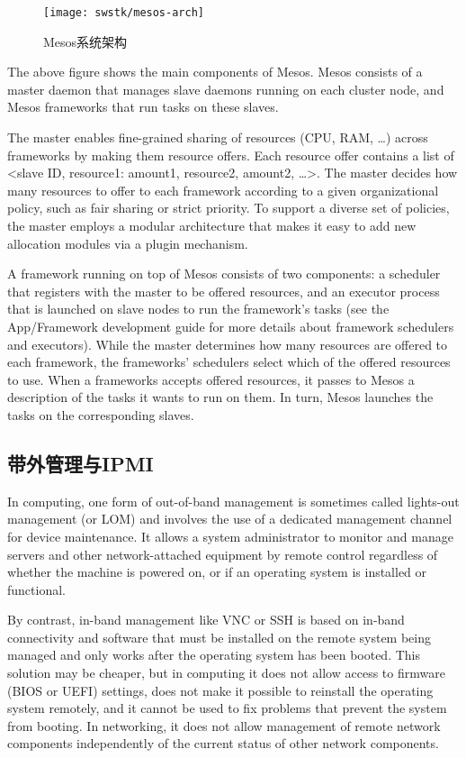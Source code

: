 \begin{figure}[tbh]
  \centering
  \texttt{[image: swstk/mesos-arch]}
  \caption{Mesos系统架构}
  \label{fig:mesos-arch}
\end{figure}

The above figure shows the main components of Mesos. Mesos consists of a master daemon that manages slave daemons running on each cluster node, and Mesos frameworks that run tasks on these slaves.

The master enables fine-grained sharing of resources (CPU, RAM, …) across frameworks by making them resource offers. Each resource offer contains a list of <slave ID, resource1: amount1, resource2, amount2, …>. The master decides how many resources to offer to each framework according to a given organizational policy, such as fair sharing or strict priority. To support a diverse set of policies, the master employs a modular architecture that makes it easy to add new allocation modules via a plugin mechanism.

A framework running on top of Mesos consists of two components: a scheduler that registers with the master to be offered resources, and an executor process that is launched on slave nodes to run the framework’s tasks (see the App/Framework development guide for more details about framework schedulers and executors). While the master determines how many resources are offered to each framework, the frameworks' schedulers select which of the offered resources to use. When a frameworks accepts offered resources, it passes to Mesos a description of the tasks it wants to run on them. In turn, Mesos launches the tasks on the corresponding slaves.

\subsection{带外管理与IPMI}

In computing, one form of out-of-band management is sometimes called lights-out management (or LOM) and involves the use of a dedicated management channel for device maintenance. It allows a system administrator to monitor and manage servers and other network-attached equipment by remote control regardless of whether the machine is powered on, or if an operating system is installed or functional.

By contrast, in-band management like VNC or SSH is based on in-band connectivity and software that must be installed on the remote system being managed and only works after the operating system has been booted. This solution may be cheaper, but in computing it does not allow access to firmware (BIOS or UEFI) settings, does not make it possible to reinstall the operating system remotely, and it cannot be used to fix problems that prevent the system from booting. In networking, it does not allow management of remote network components independently of the current status of other network components.

